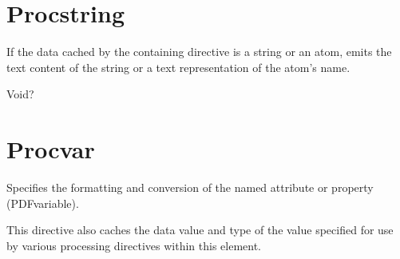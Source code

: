 \documentclass[letterpaper,12pt,english,openany,oneside]{sphinxmanual}
\begin{document}
\begin{sphinxVerbatim}[commandchars=\\\{\}]
        
\end{sphinxVerbatim}


\section{Proc\sphinxhyphen{}string}
\label{\detokenize{SaveAsXML_DirectivesRef:proc-string}}
If the data cached by the containing  directive is a string or an atom, emits the text content of the string or a text representation of the atom’s name.

\label{\detokenize{SaveAsXML_DirectivesRef:dtd-content-rule-24}}

\begin{sphinxVerbatim}[commandchars=\\\{\}]
Void?
\end{sphinxVerbatim}


\section{Proc\sphinxhyphen{}var}
\label{\detokenize{SaveAsXML_DirectivesRef:proc-var}}
Specifies the formatting and conversion of the named attribute or property (PDF\sphinxhyphen{}variable).

This directive also caches the data value and type of the value specified for use by various processing directives within this element.

\label{\detokenize{SaveAsXML_DirectivesRef:dtd-content-rule-25}}
\end{document}
